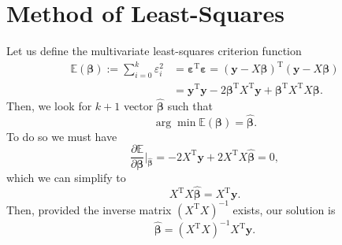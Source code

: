 \documentclass[10pt,a4paper, twocolumn, conference]{IEEEtran}
\theoremstyle{own}
\theoremstyle{definition}
\theoremstyle{plain}
\begin{document}
\section{Method of Least-Squares}
Let us define the multivariate least-squares criterion function
\begin{align} \nonumber
\mathbb{E}(\boldsymbol\beta) := \sum_{i = 0}^k \varepsilon_i^2 & = \boldsymbol\varepsilon^{\text{T}} \boldsymbol\varepsilon = (\mathbf{y} - X \boldsymbol\beta)^{\text{T}} (\mathbf{y} - X \boldsymbol\beta) \\
& = \mathbf{y}^{\text{T}}\mathbf{y} - 2\boldsymbol\beta^{\text{T}}X^{\text{T}}\mathbf{y} + \boldsymbol\beta^{\text{T}}X^{\text{T}} X\boldsymbol\beta.
\end{align}
Then, we look for $k+1$ vector $\hat{\boldsymbol\beta}$ such that
\begin{equation}
\arg \min \mathbb{E} (\boldsymbol\beta) = \hat{\boldsymbol\beta}.
\end{equation}
To do so we must have
\begin{equation}
\frac{\partial \mathbb{E}}{\partial \boldsymbol\beta} \Big|_{\hat{\boldsymbol\beta}} = -2X^{\text{T}}\mathbf{y} + 2 X^{\text{T}} X \hat{\boldsymbol\beta} =  0,
\end{equation}
which we can simplify to
\begin{equation}
X^{\text{T}} X \hat{\boldsymbol\beta} = X^{\text{T}}\mathbf{y}.
\end{equation}
Then, provided the inverse matrix $(X^{\text{T}} X)^{-1}$ exists, our solution is
\begin{equation}
\hat{\boldsymbol\beta} = (X^{\text{T}} X)^{-1} X^{\text{T}}\mathbf{y}.
\end{equation}
















 
\end{document}
